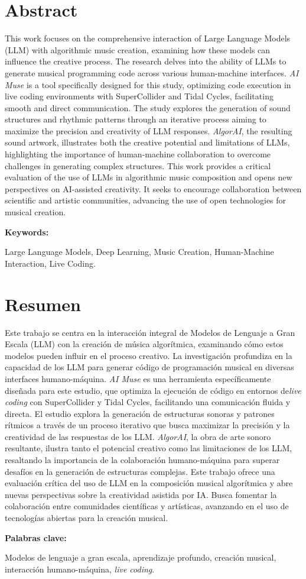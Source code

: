   \clearpage
  \chapter*{Abstract}

  This work focuses on the comprehensive interaction of Large Language Models (LLM) with algorithmic music creation, examining how these models can influence the creative process. The research delves into the ability of LLMs to generate musical programming code across various human-machine interfaces. \emph{AI Muse} is a tool specifically designed for this study, optimizing code execution in live coding environments with SuperCollider and Tidal Cycles, facilitating smooth and direct communication. The study explores the generation of sound structures and rhythmic patterns through an iterative process aiming to maximize the precision and creativity of LLM responses. \emph{AlgorAI}, the resulting sound artwork, illustrates both the creative potential and limitations of LLMs, highlighting the importance of human-machine collaboration to overcome challenges in generating complex structures. This work provides a critical evaluation of the use of LLMs in algorithmic music composition and opens new perspectives on AI-assisted creativity. It seeks to encourage collaboration between scientific and artistic communities, advancing the use of open technologies for musical creation.

  \vspace{1cm}
  \textbf{Keywords:} %
  
  Large Language Models, Deep Learning, Music Creation, Human-Machine Interaction, Live Coding.


  \clearpage
  \chapter*{Resumen}

  Este trabajo se centra en la interacción integral de Modelos de Lenguaje a Gran Escala (LLM) con la creación de música algorítmica, examinando cómo estos modelos pueden influir en el proceso creativo. La investigación profundiza en la capacidad de los LLM para generar código de programación musical en diversas interfaces humano-máquina. \emph{AI Muse} es una herramienta específicamente diseñada para este estudio, que optimiza la ejecución de código en entornos de\emph{live coding} con SuperCollider y Tidal Cycles, facilitando una comunicación fluida y directa. El estudio explora la generación de estructuras sonoras y patrones rítmicos a través de un proceso iterativo que busca maximizar la precisión y la creatividad de las respuestas de los LLM. \emph{AlgorAI}, la obra de arte sonoro resultante, ilustra tanto el potencial creativo como las limitaciones de los LLM, resaltando la importancia de la colaboración humano-máquina para superar desafíos en la generación de estructuras complejas. Este trabajo ofrece una evaluación crítica del uso de LLM en la composición musical algorítmica y abre nuevas perspectivas sobre la creatividad asistida por IA. Busca fomentar la colaboración entre comunidades científicas y artísticas, avanzando en el uso de tecnologías abiertas para la creación musical.

  \vspace{1cm}
  \textbf{Palabras clave:} %

  Modelos de lenguaje a gran escala, aprendizaje profundo, creación musical, interacción humano-máquina, \emph{live coding}.
  